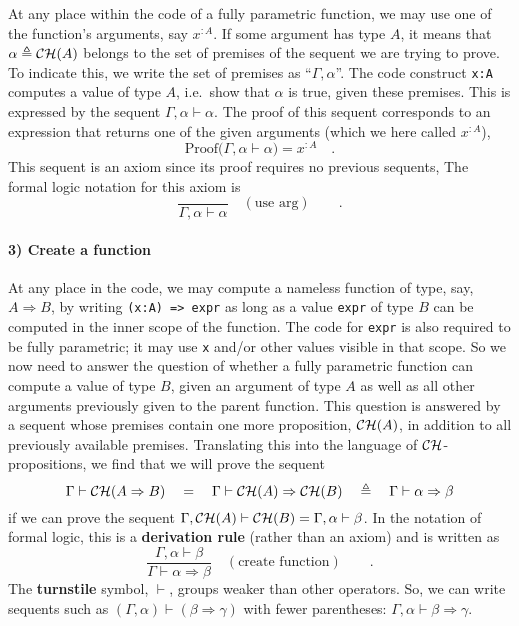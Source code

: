 At any place within the code of a fully parametric function, we may
use one of the function's arguments, say $x^{:A}$. If some argument
has type $A$, it means that $\alpha\triangleq{\cal CH}(A)$ belongs
to the set of premises of the sequent we are trying to prove. To indicate
this, we write the set of premises as ``$\Gamma,\alpha$''. The
code construct \lstinline!x:A! computes a value of type $A$, i.e.~show
that $\alpha$ is true, given these premises. This is expressed by
the sequent $\Gamma,\alpha\vdash\alpha$. The proof of this sequent
corresponds to an expression that returns one of the given arguments
(which we here called $x^{:A}$),
\[
\text{Proof}\big(\Gamma,\alpha\vdash\alpha\big)=x^{:A}\quad.
\]
This sequent is an axiom since its proof requires no previous sequents,
The formal logic notation for this axiom is
\[
\frac{~}{\Gamma,\alpha\vdash\alpha}\quad(\text{use arg})\quad\quad.
\]


\paragraph{3) Create a function}

At any place in the code, we may compute a nameless function of type,
say, $A\Rightarrow B$, by writing \lstinline!(x:A) => expr! as long
as a value \lstinline!expr! of type $B$ can be computed in the inner
scope of the function. The code for \lstinline!expr! is also required
to be fully parametric; it may use \lstinline!x! and/or other values
visible in that scope. So we now need to answer the question of whether
a fully parametric function can compute a value of type $B$, given
an argument of type $A$ as well as all other arguments previously
given to the parent function. This question is answered by a sequent
whose premises contain one more proposition, ${\cal CH}(A)$, in addition
to all previously available premises. Translating this into the language
of ${\cal CH}$-propositions, we find that we will prove the sequent
\[
\Gamma\vdash{\cal CH}(A\Rightarrow B)\quad=\quad\Gamma\vdash{\cal CH}(A)\Rightarrow{\cal CH}(B)\quad\triangleq\quad\Gamma\vdash\alpha\Rightarrow\beta
\]
if we can prove the sequent $\Gamma,{\cal CH}(A)\vdash{\cal CH}(B)=\Gamma,\alpha\vdash\beta$.
In the notation of formal logic, this is a \textbf{derivation rule}
(rather than an axiom) and is written as
\[
\frac{\Gamma,\alpha\vdash\beta}{\Gamma\vdash\alpha\Rightarrow\beta}\quad(\text{create function})\quad\quad.
\]
The \textbf{turnstile} symbol, $\vdash$, groups
weaker than other operators. So, we can write sequents such as $(\Gamma,\alpha)\vdash(\beta\Rightarrow\gamma)$
with fewer parentheses: $\Gamma,\alpha\vdash\beta\Rightarrow\gamma$.

